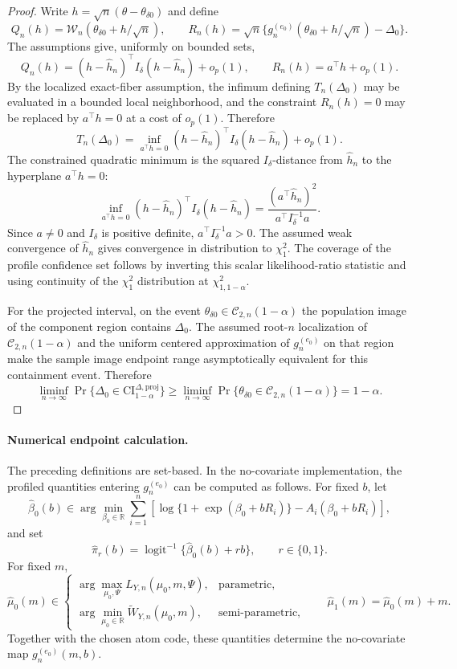 \documentclass[11pt]{article}
\begin{document}
\begin{proof}
Write $h=\sqrt n(\theta-\theta_{\delta0})$ and define
\[
  Q_n(h)=\mathcal W_n(\theta_{\delta0}+h/\sqrt n),
  \qquad
  R_n(h)=\sqrt n\{g_n^{(e_0)}(\theta_{\delta0}+h/\sqrt n)-\Delta_0\}.
\]
The assumptions give, uniformly on bounded sets,
\[
  Q_n(h)=(h-\widehat h_n)^\top I_\delta(h-\widehat h_n)+o_p(1),
  \qquad
  R_n(h)=a^\top h+o_p(1).
\]
By the localized exact-fiber assumption, the infimum defining $T_n(\Delta_0)$ may be evaluated in a bounded local neighborhood, and the constraint $R_n(h)=0$ may be replaced by $a^\top h=0$ at a cost of $o_p(1)$. Therefore
\[
  T_n(\Delta_0)
  =
  \inf_{a^\top h=0}
  (h-\widehat h_n)^\top I_\delta(h-\widehat h_n)+o_p(1).
\]
The constrained quadratic minimum is the squared $I_\delta$-distance from $\widehat h_n$ to the hyperplane $a^\top h=0$:
\[
  \inf_{a^\top h=0}
  (h-\widehat h_n)^\top I_\delta(h-\widehat h_n)
  =
  \frac{(a^\top \widehat h_n)^2}{a^\top I_\delta^{-1}a}.
\]
Since $a\neq0$ and $I_\delta$ is positive definite, $a^\top I_\delta^{-1}a>0$. The assumed weak convergence of $\widehat h_n$ gives convergence in distribution to $\chi^2_1$. The coverage of the profile confidence set follows by inverting this scalar likelihood-ratio statistic and using continuity of the $\chi^2_1$ distribution at $\chi^2_{1,1-\alpha}$.

For the projected interval, on the event $\theta_{\delta0}\in\mathcal C_{2,n}(1-\alpha)$ the population image of the component region contains $\Delta_0$. The assumed root-$n$ localization of $\mathcal C_{2,n}(1-\alpha)$ and the uniform centered approximation of $g_n^{(e_0)}$ on that region make the sample image endpoint range asymptotically equivalent for this containment event. Therefore
\[
  \liminf_{n\to\infty}
  \Pr\{\Delta_0\in\mathrm{CI}^{\Delta,\mathrm{proj}}_{1-\alpha}\}
  \ge
  \liminf_{n\to\infty}
  \Pr\{\theta_{\delta0}\in\mathcal C_{2,n}(1-\alpha)\}
  =
  1-\alpha .
\]
\end{proof}

\paragraph{Numerical endpoint calculation.}
The preceding definitions are set-based. In the no-covariate implementation, the profiled quantities entering $g_n^{(e_0)}$ can be computed as follows. For fixed $b$, let
\[
  \widehat{\beta}_0(b)
  \in
  \arg\min_{\beta_0\in\mathbb{R}}
  \sum_{i=1}^n
  \left[
    \log\{1+\exp(\beta_0+bR_i)\}
    -
    A_i(\beta_0+bR_i)
  \right],
\]
and set
\[
  \widehat{\pi}_r(b)
  =
  \operatorname{logit}^{-1}\{\widehat{\beta}_0(b)+rb\},
  \qquad r\in\{0,1\}.
\]
For fixed $m$,
\[
  \widehat{\mu}_0(m)
  \in
  \begin{cases}
    \arg\max\limits_{\mu_0,\Psi} L_{Y,n}(\mu_0,m,\Psi), & \text{parametric},\\[0.8em]
    \arg\min\limits_{\mu_0\in\mathbb{R}} \widetilde{W}_{Y,n}(\mu_0,m), & \text{semi-parametric},
  \end{cases}
  \qquad
  \widehat{\mu}_1(m)=\widehat{\mu}_0(m)+m.
\]
Together with the chosen atom code, these quantities determine the no-covariate map $g_n^{(e_0)}(m,b)$.
\end{document}
